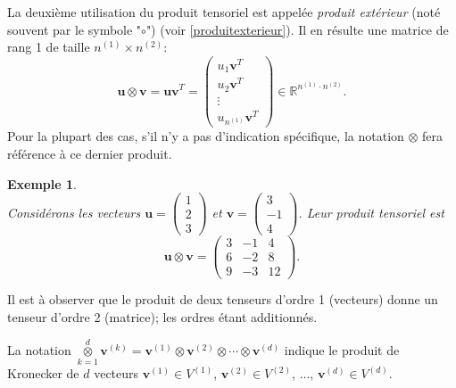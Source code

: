 \documentclass[11pt,a4paper,oneside]{book}
\newtheorem{ex}{Exemple}[chapter]}
\def\R{\mathbb R}
\def\ktensor{\overset{d}{\underset{k=1}{\otimes}}}
\newcommand{\mbf}[1]{\mathbf{#1}}
\begin{document}
La deuxième utilisation du produit tensoriel est appelée \textit{produit extérieur} (noté souvent par le symbole  "$ \circ $") (voir \eqref{produitexterieur}). Il en résulte une matrice de rang 1 de taille $ n^{(1)}\times n^{(2)} $:
\begin{equation}
\mbf{u}\otimes \mbf{v}=\mbf{u}\mbf{v}^{T}=\begin{pmatrix}
u_{1}\mbf{v}^{T}\\
u_{2}\mbf{v}^{T}\\
\vdots\\
u_{n^{(1)}}\mbf{v}^{T}
\end{pmatrix}\in \R^{n^{(1)}\cdot n^{(2)}}.
\end{equation}
Pour la plupart des cas, s'il n'y a pas d'indication spécifique, la notation $ \otimes $ fera référence à ce dernier produit.
\begin{ex}
	\emph{\\}
	Considérons les vecteurs $ \mbf{u}=\begin{pmatrix}
	1\\
	2\\
	3
	\end{pmatrix} $ et $ \mbf{v}=\begin{pmatrix}
	3\\
	-1\\
	4
	\end{pmatrix} $. Leur produit tensoriel est
	\begin{equation*}
	\mbf{u}\otimes \mbf{v}=\begin{pmatrix}
	3&-1&4\\
	6&-2&8\\
	9&-3&12
	\end{pmatrix}.
	\end{equation*}
\end{ex}
Il est à observer que le produit de deux tenseurs d'ordre 1 (vecteurs) donne un tenseur d'ordre 2 (matrice); les ordres étant additionnés.

La notation $ \ktensor \mbf{v}^{(k)}=\mbf{v}^{(1)}\otimes \mbf{v}^{(2)}\otimes \cdots\otimes \mbf{v}^{(d)} $ indique le produit de Kronecker de $ d $ vecteurs $ \mbf{v}^{(1)}\in V^{(1)} $, $ \mbf{v}^{(2)}\in V^{(2)} $, $\dots$, $ \mbf{v}^{(d)}\in V^{(d)} $.

\end{document}
